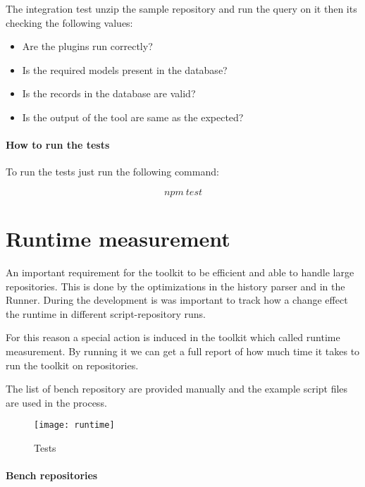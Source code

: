 The integration test unzip the sample repository and run the query on it then its checking the following values:

\begin{itemize}
	\item Are the plugins run correctly?
	\item Is the required models present in the database?
	\item Is the records in the database are valid?
	\item Is the output of the tool are same as the expected?
\end{itemize}

\subsubsection{How to run the tests}

To run the tests just run the following command:

\[ npm\ test \]


\chapter{Runtime measurement}
\label{appx:simulation}

An important requirement for the toolkit to be efficient and able to handle large repositories. This is done by the optimizations in the history parser and in the Runner. During the development is was important to track how a change effect the runtime in different script-repository runs.   

For this reason a special action is induced in the toolkit which called runtime measurement. By running it we can get a full report of how much time it takes to run the toolkit on repositories.

The list of bench repository are provided manually and the example script files are used in the process.

\begin{figure}[H]
	\centering
	\texttt{[image: runtime]}
	\caption{Tests}
	\label{fig:fig-runtime}
\end{figure}

\subsubsection{Bench repositories}

